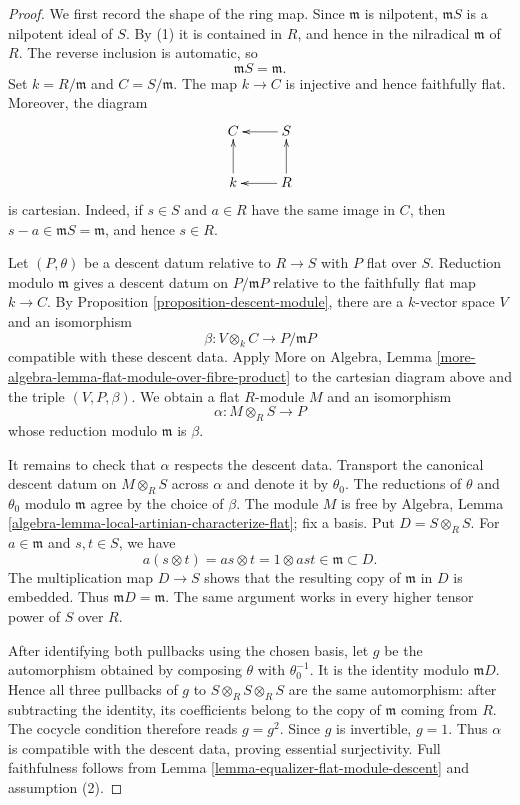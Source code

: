 \begin{proof}
We first record the shape of the ring map. Since $\mathfrak m$ is nilpotent,
$\mathfrak mS$ is a nilpotent ideal of $S$. By (1) it is contained in $R$,
and hence in the nilradical $\mathfrak m$ of $R$. The reverse inclusion is
automatic, so
$$
\mathfrak mS = \mathfrak m.
$$
Set $k = R/\mathfrak m$ and $C = S/\mathfrak m$. The map $k \to C$ is
injective and hence faithfully flat. Moreover, the diagram
$$
\xymatrix{
C & S \ar[l] \\
k \ar[u] & R \ar[l] \ar[u]
}
$$
is cartesian. Indeed, if $s \in S$ and $a \in R$ have the same image in
$C$, then $s - a \in \mathfrak mS = \mathfrak m$, and hence $s \in R$.

Let $(P, \theta)$ be a descent datum relative to $R \to S$ with $P$ flat
over $S$. Reduction modulo $\mathfrak m$ gives a descent datum on
$P/\mathfrak mP$ relative to the faithfully flat map $k \to C$. By
Proposition \ref{proposition-descent-module}, there are a $k$-vector space
$V$ and an isomorphism
$$
\beta : V \otimes_k C \longrightarrow P/\mathfrak mP
$$
compatible with these descent data. Apply More on Algebra, Lemma
\ref{more-algebra-lemma-flat-module-over-fibre-product} to the cartesian
diagram above and the triple $(V, P, \beta)$. We obtain a flat $R$-module
$M$ and an isomorphism
$$
\alpha : M \otimes_R S \longrightarrow P
$$
whose reduction modulo $\mathfrak m$ is $\beta$.

It remains to check that $\alpha$ respects the descent data. Transport the
canonical descent datum on $M \otimes_R S$ across $\alpha$ and denote it by
$\theta_0$. The reductions of $\theta$ and $\theta_0$ modulo $\mathfrak m$
agree by the choice of $\beta$. The module $M$ is free by Algebra, Lemma
\ref{algebra-lemma-local-artinian-characterize-flat}; fix a basis. Put
$D = S \otimes_R S$. For $a \in \mathfrak m$ and $s,t \in S$, we have
$$
a(s \otimes t) = as \otimes t = 1 \otimes ast \in \mathfrak m \subset D.
$$
The multiplication map $D \to S$ shows that the resulting copy of
$\mathfrak m$ in $D$ is embedded. Thus $\mathfrak mD = \mathfrak m$.
The same argument works in every higher tensor power of $S$ over $R$.

After identifying both pullbacks using the chosen basis, let $g$ be the
automorphism obtained by composing $\theta$ with $\theta_0^{-1}$. It is the
identity modulo $\mathfrak mD$. Hence all three pullbacks of $g$ to
$S \otimes_R S \otimes_R S$ are the same automorphism: after subtracting the
identity, its coefficients belong to the copy of $\mathfrak m$ coming from
$R$. The cocycle condition therefore reads $g = g^2$. Since $g$ is
invertible, $g = 1$. Thus $\alpha$ is compatible with the descent data, proving
essential surjectivity. Full faithfulness follows from
Lemma \ref{lemma-equalizer-flat-module-descent} and assumption (2).
\end{proof}

